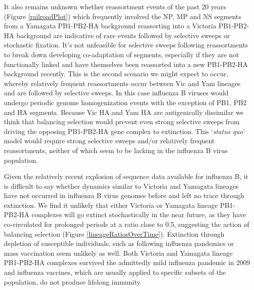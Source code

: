 \documentclass[11pt,oneside,letterpaper]{article}
\begin{document}
It also remains unknown whether reassortment events of the past 20 years (Figure \ref{railroadPlot}) which frequently involved the NP, MP and NS segments from a Yamagata PB1-PB2-HA background reassorting into a Victoria PB1-PB2-HA background are indicative of rare events followed by selective sweeps or stochastic fixation.
It's not unfeasible for selective sweeps following reassortments to break down developing co-adaptation of segments, especially if they are not functionally linked and have themselves been reassorted into a new PB1-PB2-HA background recently.
This is the second scenario we might expect to occur, whereby relatively frequent reassortments occur between Vic and Yam lineages and are followed by selective sweeps.
In this case influenza B viruses would undergo periodic genome homogenization events with the exception of PB1, PB2 and HA segments.
Because Vic HA and Yam HA are antigenically dissimilar we think that balancing selection would prevent even strong selective sweeps from driving the opposing PB1-PB2-HA gene complex to extinction.
This `\textit{status quo}' model would require strong selective sweeps and/or relatively frequent reassortments, neither of which seem to be lacking in the influenza B virus population.

Given the relatively recent explosion of sequence data available for influenza B, it is difficult to say whether dynamics similar to Victoria and Yamagata lineages have not occurred in influenza B virus genomes before and left no trace through extinction.
We find it unlikely that either Victoria or Yamagata lineage PB1-PB2-HA complexes will go extinct stochastically in the near future, as they have co-circulated for prolonged periods at a ratio close to 0.5, suggesting the action of balancing selection (Figure \ref{lineageRatiosOverTime}).
Extinction through depletion of susceptible individuals, such as following influenza pandemics or mass vaccination seem unlikely as well.
Both Victoria and Yamagata lineage PB1-PB2-HA complexes survived the admittedly mild influenza pandemic in 2009 and influenza vaccines, which are usually applied to specific subsets of the population, do not produce lifelong immunity.
\end{document}
